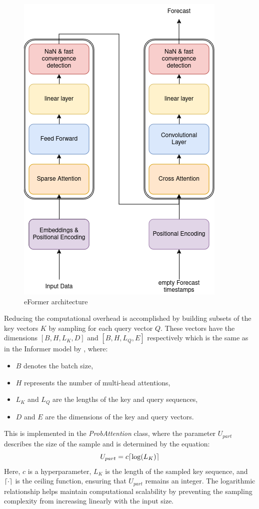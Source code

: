\documentclass{article}
\DeclarePairedDelimiter{\ceil}{\lceil}{\rceil}
\begin{document}
\begin{figure}
    \centering
    \includegraphics[width=0.5\linewidth]{graphs/models/eFormer_final.png}
    \caption{eFormer architecture}
    \label{fig:eFormer_sparse}
\end{figure}

Reducing the computational overhead is accomplished by building subsets of the key vectors $K$ by sampling for each query vector $Q$. These vectors have the dimensions $[B, H, L_K, D]$ and $[B, H, L_Q, E]$ respectively which is the same as in the Informer model by \cite{Informer}, where:
\begin{itemize}
    \item $B$ denotes the batch size,
    \item $H$ represents the number of multi-head attentions,
    \item $L_K$ and $L_Q$ are the lengths of the key and query sequences,
    \item $D$ and $E$ are the dimensions of the key and query vectors.
\end{itemize}

This is implemented in the \textit{ProbAttention} class, where the parameter $U_{part}$ describes the size of the sample and is determined by the equation:
\begin{equation}
    U_{part} = c \ceil*{\log(L_K)}
\end{equation}
Here, $c$ is a hyperparameter, $L_K$ is the length of the sampled key sequence, and $\ceil*{\cdot}$ is the ceiling function, ensuring that $U_{part}$ remains an integer. The logarithmic relationship helps maintain computational scalability by preventing the sampling complexity from increasing linearly with the input size.
\end{document}
